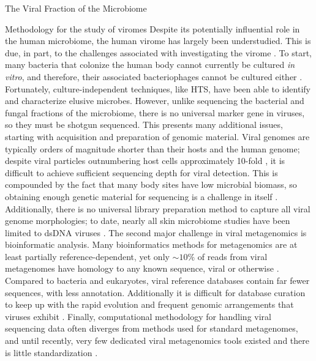 \documentclass[oneside,12pt,final]{sty/ucthesis-CA2012}
\begin{document}
\begin{mainmatter}
\begin{section}{The Viral Fraction of the Microbiome}
\begin{subsection}{Methodology for the study of viromes}
Despite its potentially influential role in the human microbiome, the human virome has largely been understudied. This is due, in part, to the challenges associated with investigating the virome \cite{RN142}. To start, many bacteria that colonize the human body cannot currently be cultured \textit{in vitro}, and therefore, their associated bacteriophages cannot be cultured either \cite{RN125, RN168}. Fortunately, culture-independent techniques, like HTS, have been able to identify and characterize elusive microbes. However, unlike sequencing the bacterial and fungal fractions of the microbiome, there is no universal marker gene in viruses, so they must be shotgun sequenced. This presents many additional issues, starting with acquisition and preparation of genomic material. Viral genomes are typically orders of magnitude shorter than their hosts and the human genome; despite viral particles outnumbering host cells approximately 10-fold \cite{RN122}, it is difficult to achieve sufficient sequencing depth for viral detection. This is compounded by the fact that many body sites have low microbial biomass, so obtaining enough genetic material for sequencing is a challenge in itself \cite{RN169}. Additionally, there is no universal library preparation method to capture all viral genome morphologies; to date, nearly all skin microbiome studies have been limited to dsDNA viruses \cite{RN126}. The second major challenge in viral metagenomics is bioinformatic analysis. Many bioinformatics methods for metagenomics are at least partially reference-dependent, yet only $\sim10\%$ of reads from viral metagenomes have homology to any known sequence, viral or otherwise \cite{RN79}. Compared to bacteria and eukaryotes, viral reference databases contain far fewer sequences, with less annotation. Additionally it is difficult for database curation to keep up with the rapid evolution and frequent genomic arrangements that viruses exhibit \cite{RN129}. Finally, computational methodology for handling viral sequencing data often diverges from methods used for standard metagenomes, and until recently, very few dedicated viral metagenomics tools existed and there is little standardization \cite{RN127}.


\end{subsection}
\end{section}
\end{mainmatter}
\end{document}
